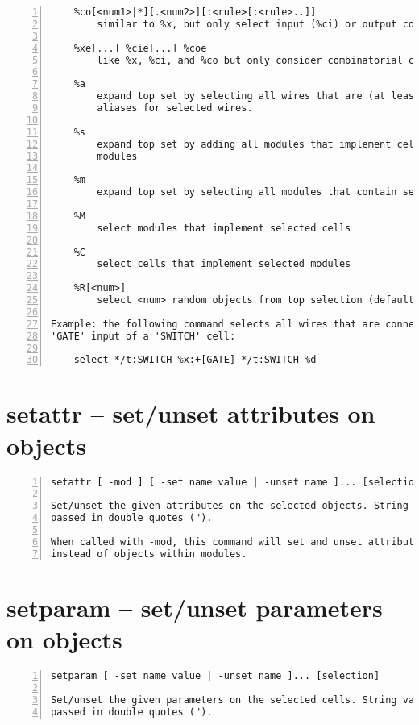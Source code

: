 \begin{lstlisting}[numbers=left,frame=single]
    %ci[<num1>|*][.<num2>][:<rule>[:<rule>..]]
    %co[<num1>|*][.<num2>][:<rule>[:<rule>..]]
        similar to %x, but only select input (%ci) or output cones (%co)

    %xe[...] %cie[...] %coe
        like %x, %ci, and %co but only consider combinatorial cells

    %a
        expand top set by selecting all wires that are (at least in part)
        aliases for selected wires.

    %s
        expand top set by adding all modules that implement cells in selected
        modules

    %m
        expand top set by selecting all modules that contain selected objects

    %M
        select modules that implement selected cells

    %C
        select cells that implement selected modules

    %R[<num>]
        select <num> random objects from top selection (default 1)

Example: the following command selects all wires that are connected to a
'GATE' input of a 'SWITCH' cell:

    select */t:SWITCH %x:+[GATE] */t:SWITCH %d
\end{lstlisting}

\section{setattr -- set/unset attributes on objects}
\label{cmd:setattr}
\begin{lstlisting}[numbers=left,frame=single]
    setattr [ -mod ] [ -set name value | -unset name ]... [selection]

Set/unset the given attributes on the selected objects. String values must be
passed in double quotes (").

When called with -mod, this command will set and unset attributes on modules
instead of objects within modules.
\end{lstlisting}

\section{setparam -- set/unset parameters on objects}
\label{cmd:setparam}
\begin{lstlisting}[numbers=left,frame=single]
    setparam [ -set name value | -unset name ]... [selection]

Set/unset the given parameters on the selected cells. String values must be
passed in double quotes (").
\end{lstlisting}

